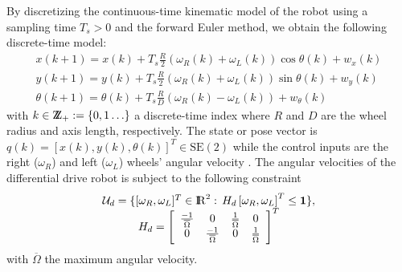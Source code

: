 \documentclass[letterpaper, 10 pt, conference]{ieeeconf}
\newcommand{\rr}{\mathop{{\rm I}\mskip-4.0mu{\rm R}}\nolimits}
\newcommand{\Z}{\mathop{{\rm Z}\mskip-7.0mu{\rm Z}}\nolimits}
\begin{document}

By discretizing the continuous-time kinematic model of the robot using a sampling time $T_s>0$ and the forward Euler method, we obtain the following discrete-time model:
\begin{equation}\label{eq:diffdrive-discrete}
  \begin{array}{c}
    x(k+1)=x(k)+T_s\frac{R}{2}\left(\omega_R(k)+\omega_L(k)\right)\cos\theta(k) + w_x(k)\\
    y(k+1)=y(k)+T_s\frac{R}{2}\left(\omega_R(k)+\omega_L(k)\right)\sin \theta(k) + w_y(k)\\
    \theta(k+1)=\theta(k)+T_s\frac{R}{D}(\omega_R(k)-\omega_L(k)) + w_{\theta}(k)
  \end{array}
\end{equation}
with $k\in \Z_+:=\{0,1\ldots\}$ a discrete-time index where $R$ and $D$ are the wheel radius and  axis length, respectively. The state or pose vector is $q(k)=[x(k),y(k),\theta(k)]^T \in \text{SE}(2)$ while the control inputs are the right ($\omega_R$) and left ($\omega_L$) wheels' angular velocity . The angular velocities of the differential drive robot is subject to the following constraint
%
\begin{equation}\label{eq:diff-drive-constraints}
  \begin{array}{c}
    \mathcal{U}_d=\{[\omega_R,\omega_L]^T\in\rr^2:\, H_d\left[\omega_R,\omega_L \right]^T\leq \bf{1}\},  \\
    H_d=\left[
      \begin{array}{cccc}
        \frac{-1}{\overline{\Omega}} & 0 & \frac{1}{\overline{\Omega}}&0\\
        0 & \frac{-1}{\overline{\Omega}} & 0 &\frac{1}{\overline{\Omega}} \\
    \end{array}\right]^T
  \end{array}
\end{equation}
%
with $\overline{\Omega}$ the maximum angular velocity.
\end{document}
